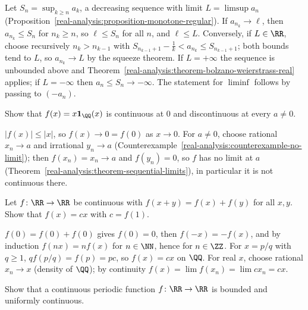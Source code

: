 \begin{solution}
Let $S_n = \sup_{k \geq n}a_k$, a decreasing sequence with limit $L = \limsup a_n$ (Proposition~\ref{real-analysis:proposition-monotone-regular}). If $a_{n_k} \to \ell$, then $a_{n_k} \leq S_n$ for $n_k \geq n$, so $\ell \leq S_n$ for
all $n$, and $\ell \leq L$. Conversely, if $L \in \RR$, choose recursively $n_k > n_{k-1}$ with $S_{n_{k-1}+1} - \frac1k < a_{n_k} \leq S_{n_{k-1}+1}$; both bounds tend to $L$, so $a_{n_k} \to L$ by the squeeze theorem. If
$L = +\infty$ the sequence is unbounded above and Theorem~\ref{real-analysis:theorem-bolzano-weierstrass-real} applies; if $L = -\infty$ then $a_n \leq S_n \to -\infty$. The statement for $\liminf$ follows by passing to
$(-a_n)$.
\end{solution}

\begin{exercise}\label{real-analysis:exercise-continuous-one-point}
Show that $f(x) = x\mathbf{1}_\QQ(x)$ is continuous at $0$ and discontinuous at every $a \neq 0$.
\end{exercise}

\begin{solution}
$|f(x)| \leq |x|$, so $f(x) \to 0 = f(0)$ as $x \to 0$. For $a \neq 0$, choose rational $x_n \to a$ and irrational $y_n \to a$ (Counterexample~\ref{real-analysis:counterexample-no-limit}); then $f(x_n) = x_n \to a$ and
$f(y_n) = 0$, so $f$ has no limit at $a$ (Theorem~\ref{real-analysis:theorem-sequential-limits}), in particular it is not continuous there.
\end{solution}

\begin{exercise}\label{real-analysis:exercise-cauchy-functional}
Let $f \colon \RR \to \RR$ be continuous with $f(x + y) = f(x) + f(y)$ for all $x, y$. Show that $f(x) = cx$ with $c = f(1)$.
\end{exercise}

\begin{solution}
$f(0) = f(0) + f(0)$ gives $f(0) = 0$, then $f(-x) = -f(x)$, and by induction $f(nx) = nf(x)$ for $n \in \NN$, hence for $n \in \ZZ$. For $x = p/q$ with $q \geq 1$, $qf(p/q) = f(p) = pc$, so $f(x) = cx$ on $\QQ$. For
real $x$, choose rational $x_n \to x$ (density of $\QQ$); by continuity $f(x) = \lim f(x_n) = \lim cx_n = cx$.
\end{solution}

\begin{exercise}\label{real-analysis:exercise-periodic-uniform}
Show that a continuous periodic function $f \colon \RR \to \RR$ is bounded and uniformly continuous.
\end{exercise}

